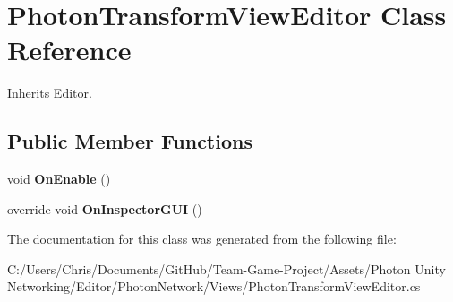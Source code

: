 \hypertarget{class_photon_transform_view_editor}{}\section{Photon\+Transform\+View\+Editor Class Reference}
\label{class_photon_transform_view_editor}


Inherits Editor.

\subsection*{Public Member Functions}
\begin{DoxyCompactItemize}
\item 
void {\bfseries On\+Enable} ()\hypertarget{class_photon_transform_view_editor_afe5f66904b0ded9661737d633d976d8c}{}\label{class_photon_transform_view_editor_afe5f66904b0ded9661737d633d976d8c}

\item 
override void {\bfseries On\+Inspector\+G\+UI} ()\hypertarget{class_photon_transform_view_editor_a2c9f8512545a3a004af03fd03829df20}{}\label{class_photon_transform_view_editor_a2c9f8512545a3a004af03fd03829df20}

\end{DoxyCompactItemize}


The documentation for this class was generated from the following file\+:\begin{DoxyCompactItemize}
\item 
C\+:/\+Users/\+Chris/\+Documents/\+Git\+Hub/\+Team-\/\+Game-\/\+Project/\+Assets/\+Photon Unity Networking/\+Editor/\+Photon\+Network/\+Views/Photon\+Transform\+View\+Editor.\+cs\end{DoxyCompactItemize}
